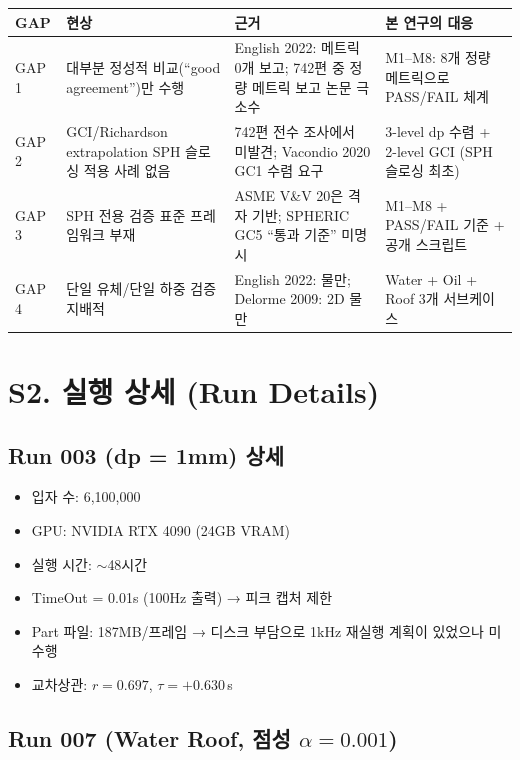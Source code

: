 \documentclass[a4paper,11pt]{article}
\begin{document}
\begin{longtable}{@{}p{2cm}p{4cm}p{4cm}p{4cm}@{}}
\toprule
GAP & 현상 & 근거 & 본 연구의 대응 \\
\midrule
\endhead
GAP 1 & 대부분 정성적 비교(``good agreement'')만 수행 &
  English 2022: 메트릭 0개 보고; 742편 중 정량 메트릭 보고 논문 극소수 &
  M1--M8: 8개 정량 메트릭으로 PASS/FAIL 체계 \\
\midrule
GAP 2 & GCI/Richardson extrapolation SPH 슬로싱 적용 사례 없음 &
  742편 전수 조사에서 미발견; Vacondio 2020 GC1 수렴 요구 &
  3-level dp 수렴 + 2-level GCI (SPH 슬로싱 최초) \\
\midrule
GAP 3 & SPH 전용 검증 표준 프레임워크 부재 &
  ASME V\&V 20은 격자 기반; SPHERIC GC5 ``통과 기준'' 미명시 &
  M1--M8 + PASS/FAIL 기준 + 공개 스크립트 \\
\midrule
GAP 4 & 단일 유체/단일 하중 검증 지배적 &
  English 2022: 물만; Delorme 2009: 2D 물만 &
  Water + Oil + Roof 3개 서브케이스 \\
\bottomrule
\end{longtable}


\section{S2. 실행 상세 (Run Details)} \label{sec:s2}

\subsection{Run 003 (dp = 1mm) 상세}

\begin{itemize}
    \item 입자 수: 6,100,000
    \item GPU: NVIDIA RTX 4090 (24GB VRAM)
    \item 실행 시간: $\sim$48시간
    \item TimeOut = 0.01s (100Hz 출력) → 피크 캡처 제한
    \item Part 파일: 187MB/프레임 → 디스크 부담으로 1kHz 재실행 계획이 있었으나 미수행
    \item 교차상관: $r = 0.697$, $\tau = +0.630$\,s
\end{itemize}

\subsection{Run 007 (Water Roof, 점성 $\alpha = 0.001$)}
\end{document}
